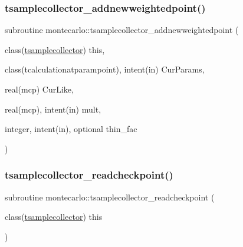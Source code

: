 \subsubsection{\texorpdfstring{tsamplecollector\+\_\+addnewweightedpoint()}{tsamplecollector\_addnewweightedpoint()}}
{\footnotesize\ttfamily subroutine montecarlo\+::tsamplecollector\+\_\+addnewweightedpoint (\begin{DoxyParamCaption}\item[{class(\mbox{\hyperlink{structmontecarlo_1_1tsamplecollector}{tsamplecollector}})}]{this,  }\item[{class(tcalculationatparampoint), intent(in)}]{Cur\+Params,  }\item[{real(mcp)}]{Cur\+Like,  }\item[{real(mcp), intent(in)}]{mult,  }\item[{integer, intent(in), optional}]{thin\+\_\+fac }\end{DoxyParamCaption})\hspace{0.3cm}{\ttfamily [private]}}

\mbox{\label{namespacemontecarlo_afee20ae5c3f0b391ff0c231302a113a0}} 
\subsubsection{\texorpdfstring{tsamplecollector\+\_\+readcheckpoint()}{tsamplecollector\_readcheckpoint()}}
{\footnotesize\ttfamily subroutine montecarlo\+::tsamplecollector\+\_\+readcheckpoint (\begin{DoxyParamCaption}\item[{class(\mbox{\hyperlink{structmontecarlo_1_1tsamplecollector}{tsamplecollector}})}]{this }\end{DoxyParamCaption})\hspace{0.3cm}{\ttfamily [private]}}

\mbox{\label{namespacemontecarlo_a6f22bd1167c2571095e2d1610a5b6d9b}} 
